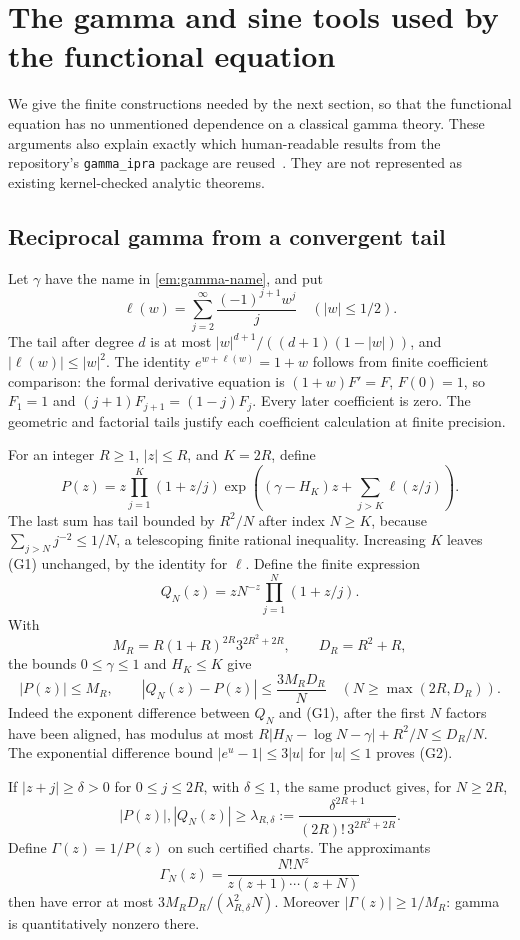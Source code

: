 \section{The gamma and sine tools used by the functional equation}
\label{sec:gamma-gateway}

We give the finite constructions needed by the next section, so that the
functional equation has no unmentioned dependence on a classical gamma
theory. These arguments also explain exactly which human-readable results
from the repository's \texttt{gamma\_ipra} package are reused~\cite{GammaRepo}.
They are not represented as existing kernel-checked analytic theorems.

\subsection{Reciprocal gamma from a convergent tail}
Let $\gamma$ have the name in \eqref{em:gamma-name}, and put
\[
 \ell(w)=\sum_{j=2}^{\infty}\frac{(-1)^{j+1}w^j}{j}
 \quad(|w|\le1/2).
\]
The tail after degree $d$ is at most
$|w|^{d+1}/((d+1)(1-|w|))$, and $|\ell(w)|\le |w|^2$.
The identity $e^{w+\ell(w)}=1+w$ follows from finite coefficient
comparison: the formal derivative equation is $(1+w)F'=F$, $F(0)=1$,
so $F_1=1$ and $(j+1)F_{j+1}=(1-j)F_j$. Every later coefficient is
zero. The geometric and factorial tails justify each coefficient
calculation at finite precision.

For an integer $R\ge1$, $|z|\le R$, and $K=2R$, define
\[
 P(z)=z\prod_{j=1}^{K}(1+z/j)
 \exp\left((\gamma-H_K)z+\sum_{j>K}\ell(z/j)\right).
 \tag{G1}\label{eq:recip-gamma}
\]
The last sum has tail bounded by $R^2/N$ after index $N\ge K$, because
$\sum_{j>N}j^{-2}\le1/N$, a telescoping finite rational inequality.
Increasing $K$ leaves (G1) unchanged, by the identity for $\ell$.
Define the finite expression
\[
 Q_N(z)=zN^{-z}\prod_{j=1}^N(1+z/j).
\]
With
\[
 M_R=R(1+R)^{2R}3^{2R^2+2R},\qquad D_R=R^2+R,
\]
the bounds $0\le\gamma\le1$ and $H_K\le K$ give
\[
 |P(z)|\le M_R,\qquad
 |Q_N(z)-P(z)|\le\frac{3M_RD_R}{N}
 \quad(N\ge\max(2R,D_R)).                      \tag{G2}\label{eq:gamma-product-rate}
\]
Indeed the exponent difference between $Q_N$ and (G1), after the first
$N$ factors have been aligned, has modulus at most
$R|H_N-\log N-\gamma|+R^2/N\le D_R/N$. The exponential difference
bound $|e^u-1|\le3|u|$ for $|u|\le1$ proves (G2).

If $|z+j|\ge\delta>0$ for $0\le j\le2R$, with $\delta\le1$, the
same product gives, for $N\ge2R$,
\[
 |P(z)|,|Q_N(z)|\ge
 \lambda_{R,\delta}:=
 \frac{\delta^{2R+1}}{(2R)!\,3^{2R^2+2R}}.
 \tag{G3}\label{eq:gamma-lower}
\]
Define $\Gamma(z)=1/P(z)$ on such certified charts. The approximants
\[
 \Gamma_N(z)=\frac{N!N^z}{z(z+1)\cdots(z+N)}
\]
then have error at most $3M_RD_R/(\lambda_{R,\delta}^2N)$.
Moreover $|\Gamma(z)|\ge1/M_R$: gamma is quantitatively nonzero there.

